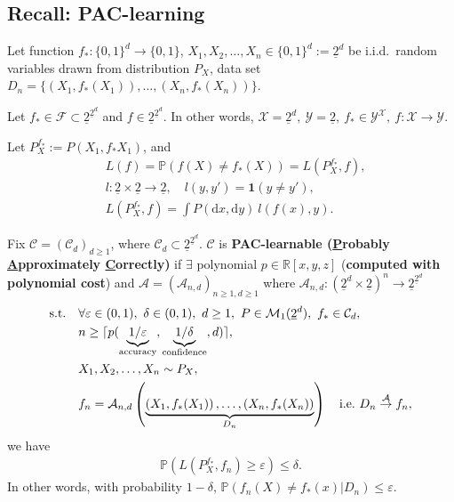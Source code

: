 \documentclass[twoside]{article}
\begin{document}
\subsection{Recall: PAC-learning}

Let function  $f_*: \{0,1\}^d \rightarrow \{0,1\}$, $ X_1, X_2, \ldots, X_n \in \{0,1\}^d := \underline{2}^d$ be i.i.d.\ random variables drawn from distribution $P_X$, data set $D_n=\{ \left( X_1, f_*(X_1)\right), \ldots, \left( X_n, f_*(X_n)\right) \}$.

Let $f_* \in \mathcal{F} \subset \underline{2}^{ \underline{2}^d } $ and $f \in \underline{2}^{ \underline{2}^d } $. In other words, $\mathcal{X}= \underline{2}^d,\ \mathcal{Y}=\underline{2},\ f_* \in \mathcal{Y}^{\mathcal{X}},\ f: \mathcal{X}\rightarrow \mathcal{Y}$.

Let $P_X^{f_*}:= P(X_1, f_*{X_1})$, and 
\begin{align*}
    & L(f) = \mathbb{P} \left( f(X) \ne f_*(X) \right) = L( P_X^{f_*} ,f ),\\
    & l: \underline{2} \times \underline{2} \rightarrow \underline{2}, \quad l(y,y') = \mathbf{1}(y\ne y'),\\
    & L( P_X^{f_*},f  ) = \int P(\mathrm{d}x, \mathrm{d}y) \ l( f(x),y ).
\end{align*}

\begin{definition}
    Fix $\mathcal{C} = (\mathcal{C}_d)_{d\ge 1}$, where $\mathcal{C}_d \subset \underline{2}^{\underline{2}^d }$. $\mathcal{C}$ is \textbf{PAC-learnable (\underline{P}robably \underline{A}pproximately \underline{C}orrectly)} if $\exists$ polynomial $p\in \mathbb{R}[x,y,z]$ (\textbf{computed with polynomial cost})  and $\mathcal{A}= (\mathcal{A}_{n,d})_{n\ge 1, d\ge 1}$ where $\mathcal{A}_{n,d}:\left( \underline{2}^d\times \underline{2} \right)^n \rightarrow  \underline{2}^{ \underline{2}^d }$
    \begin{align*}
        \text{s.t.\quad }
        & \forall  \varepsilon \in (0,1), \ \delta \in(0,1), \ d\ge 1, \ P \in \mathcal{M}_1(\underline{2}^d),\  f_* \in \mathcal{C}_d,\\
        & n\ge \lceil p( \underbrace{1/\varepsilon}_{\text{accuracy}}, \underbrace{1/\delta}_{\text{confidence}}, d )\rceil,\\
        & X_1,X_2,\ldots,X_n\sim P_X,\\
        & f_n = \mathcal{A}_{n,d} \left( \underbrace{\left( X_1, f_*(X_1)\right), \ldots, \left( X_n, f_*(X_n)\right)}_{D_n} \right)  \quad \text{i.e.\ $D_n \overset{\mathcal{A}}{\rightarrow} f_n$},
    \end{align*}
    we have
    \begin{align*}
        \mathbb{P}\left( L\left( P_X^{f_*},f_n \right) \ge \varepsilon  \right) \le \delta.
    \end{align*}
    In other words, with probability $1-\delta$, $\mathbb{P} \left( f_n(X) \ne f_*(x) | D_n \right) \le \varepsilon$.
\end{definition} 
\end{document}
